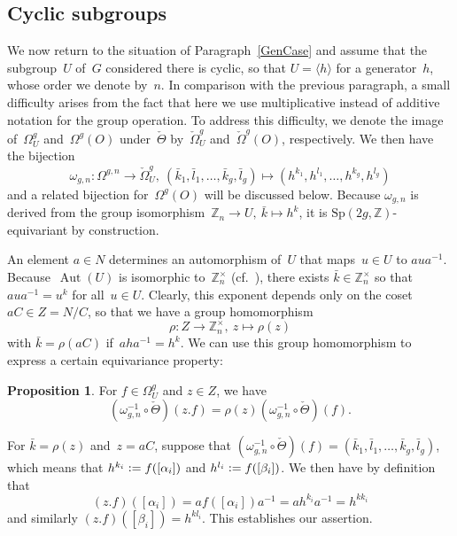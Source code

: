 \documentclass[12pt]{article}
\makeatletter
\theoremstyle{definition}
\newtheorem{Proposition}[Satz]{Proposition}
\theoremstyle{break}
\renewenvironment{proof}[1][\proofname]{\par
\vspace{-5pt}%
\pushQED{\qed}%
\normalfont
\topsep0pt \partopsep0pt %
\trivlist
\item[\hskip\labelsep
\bfseries
#1\@addpunct{.}]\ignorespaces
}{%
\popQED\endtrivlist\@endpefalse
\addvspace{6pt plus 6pt} %
}
\newcommand{\Z}{\mathbb{Z}}
\DeclareMathOperator\Aut{Aut}
\newcommand{\Sp}{\mathrm{Sp}}
\renewcommand{\1}{\mathbbm{1}}
\newcommand{\deq}{\vcentcolon =}
\makeatother
\begin{document}
\subsection{Cyclic subgroups} \label{CyclSub}
We now return to the situation of Paragraph~\ref{GenCase} and assume that the subgroup~$U$ of~$G$ considered there is cyclic, so that $U = \langle h \rangle$ for a generator~$h$, whose order we denote by~$n$. In comparison with the previous paragraph, a small difficulty arises from the fact that here we use multiplicative instead of additive notation for the group operation. To address this difficulty, we denote the image of~$\Omega^g_U$ and~$\Omega^g(O)$ under~$\check{\Theta}$ by~$\check{\Omega}^g_U$ and~$\check{\Omega}^g(O)$, respectively. We then have the bijection
\[\omega_{g,n} \colon \Omega^{g,n} \to \check{\Omega}^g_U,~(\bar{k}_1, \bar{l}_1,\ldots, \bar{k}_g, \bar{l}_g)
\mapsto (h^{k_1}, h^{l_1}, \ldots, h^{k_g}, h^{l_g})\]
and a related bijection for~$\Omega^g(O)$ will be discussed below. Because $\omega_{g,n}$ is derived from the group isomorphism~$\Z_n \to U,~\bar{k} \mapsto h^k$, it is $\Sp(2g, \Z)$-equivariant by construction.

An element $a \in N$ determines an automorphism of~$U$ that maps~$u \in U$ to $a u a^{-1}$. Because~$\Aut(U)$ is isomorphic to~$\Z_n^\times$ (cf.~\cite[2.2.2, p.~50]{KS}), there exists
$\bar{k} \in \Z_n^\times$ so that~$a u a^{-1} = u^k$ for all~$u \in U$. Clearly, this exponent depends only on the coset~$aC \in Z = N/C$, so that we have a group homomorphism
\[\rho \colon Z \to \Z_n^\times,~z \mapsto \rho(z)\]
with $\bar{k} = \rho(aC)$ if~$a h a^{-1} = h^k$. We can use this group homomorphism to express a certain equivariance property:
\begin{Proposition} \label{RhoEquiv}
For $f \in \Omega_U^g$ and $z \in Z$, we have
\[(\omega_{g,n}^{-1} \circ \check{\Theta})(z.f) =
\rho(z) (\omega_{g,n}^{-1} \circ \check{\Theta})(f).\]
\end{Proposition}
\begin{proof}
For $\bar{k} = \rho(z)$ and~$z = aC$, suppose that $(\omega_{g,n}^{-1} \circ \check{\Theta})(f) = (\bar{k}_1,\bar{l}_1,\dots,\bar{k}_g,\bar{l}_g)$, which means that
\mbox{$h^{k_i} \deq f([\alpha_i])$} and $h^{l_i} \deq f([\beta_i])$. We then have by definition that
\[(z.f)([\alpha_i]) = a f([\alpha_i]) a^{-1} = a h^{k_i} a^{-1} = h^{k k_i}\]
and similarly $(z.f)([\beta_i]) = h^{k l_i}$. This establishes our assertion.
\end{proof}
\end{document}
